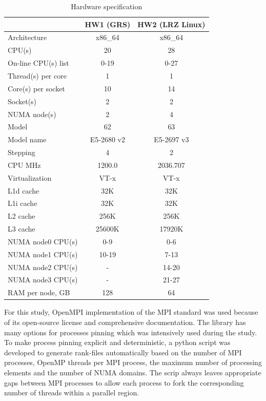\begin{table}
\centering
\small
\begin{tabular}{|l|c|c|}
\hline
                    & HW1 (GRS) & HW2 (LRZ Linux) \\ \hline
Architecture        & x86\_64 & x86\_64 \\ \hline
CPU(s)              & 20 &  28 \\ \hline
On-line CPU(s) list & 0-19 &  0-27 \\ \hline
Thread(s) per core  & 1 &  1 \\  \hline
Core(s) per socket  & 10 & 14 \\ \hline
Socket(s)           & 2 &  2 \\ \hline
NUMA node(s)        & 2 &  4 \\ \hline
Model               & 62 &  63 \\ \hline
Model name          & E5-2680 v2 & 
E5-2697 v3 \\ \hline
Stepping            & 4 &  2 \\ \hline
CPU MHz             & 1200.0 &  2036.707 \\ \hline
Virtualization      & VT-x &  VT-x \\ \hline
L1d cache           & 32K &  32K \\ \hline
L1i cache           & 32K &  32K \\ \hline
L2 cache            & 256K &  256K \\ \hline
L3 cache            & 25600K &  17920K \\ \hline
NUMA node0 CPU(s)   & 0-9 &  0-6 \\ \hline
NUMA node1 CPU(s)   & 10-19 &  7-13 \\ \hline
NUMA node2 CPU(s)   & - &  14-20 \\ \hline
NUMA node3 CPU(s)   & - &  21-27 \\ \hline
RAM per node, GB   & 128 &  64 \\ \hline
\end{tabular}
\caption{Hardware specification}
\label{table:hardware-spec}
\end{table}


For this study, OpenMPI implementation of the MPI standard was used because of its open-source license and comprehensive documentation. The library has many options for processes pinning which was intensively used during the study.\\


To make process pinning explicit and deterministic, a python script was developed to generate rank-files automatically based on the number of MPI processes, OpenMP threads per MPI process, the maximum number of processing elements and the number of NUMA domains. The scrip always leaves appropriate gaps between MPI processes to allow each process to fork the corresponding number of threads within a parallel region.\\


